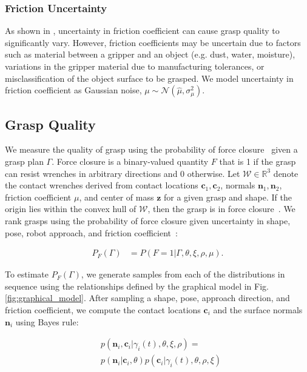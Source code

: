 \documentclass[10pt, conference]{ieeeconf}      %
\newcommand{\bc}{\mathbf{c}}
\newcommand{\bn}{\mathbf{n}}
\newcommand{\bz}{\mathbf{z}}
\newcommand{\mN}{\mathcal{N}}
\newcommand{\mW}{\mathcal{W}}
\begin{document}
 \subsubsection{Friction Uncertainty}
As shown in \cite{zheng2005}, uncertainty in friction coefficient can cause grasp quality to significantly vary.
However, friction coefficients may be uncertain due to factors such as material between a gripper and an object (e.g. dust, water, moisture), variations in the gripper material due to manufacturing tolerances, or misclassification of the object surface to be grasped.
We model uncertainty in friction coefficient as Gaussian noise, $\mu \sim \mN(\hat{\mu},\sigma_{\mu}^2)$.


\vspace{-2ex}
 
\subsection{Grasp Quality}\label{sec:grasp_sample}
We measure the quality of grasp using the probability of force closure~\cite{weisz2012pose, kim2012physically, kehoe2012estimating, kehoe2012toward} given a grasp plan $\Gamma$. Force closure is a binary-valued quantity $F$ that is 1 if the grasp can resist wrenches in arbitrary directions and 0 otherwise.
Let $\mW \in \mathbb{R}^3$ denote the contact wrenches derived from contact locations $\bc_1,\bc_2$, normals $\bn_1,\bn_2$, friction coefficient $\mu$, and center of mass $\bz$ for a given grasp and shape.
If the origin lies within the convex hull of $\mW$, then the grasp is in force closure~\cite{li1988task}.
We rank grasps using the probability of force closure given uncertainty in shape, pose, robot approach, and friction coefficient~\cite{christopoulos2007handling, kehoe2012toward}:

\vspace{-2ex}
\begin{align*}
	P_F(\Gamma) &= P \left(F = 1 | \Gamma, \theta, \xi, \rho, \mu \right).
\end{align*}

 
To estimate $P_F(\Gamma)$, we generate samples from each of the distributions in sequence using the relationships defined by the graphical model in Fig. \ref{fig:graphical_model}.
After sampling a shape, pose, approach direction, and friction coefficient, we compute the contact locations $\bc_i$ and the surface normals $\bn_i$ using Bayes rule:
 
 \vspace{-2ex}
 \begin{align*}
 &p(\textbf{n}_i,\textbf{c}_i |\gamma_i(t),\theta,\xi,\rho)=\\
 &p(\textbf{n}_i|\textbf{c}_i,\theta)p(\textbf{c}_i|\gamma_i(t),\theta,\rho,\xi)
 \end{align*}
\end{document}
